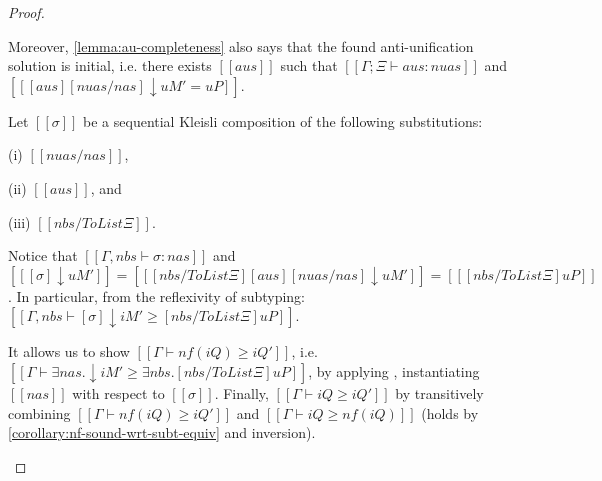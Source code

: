 \begin{proof}
\begin{caseof}
      Moreover, \cref{lemma:au-completeness} also says that the found anti-unification 
      solution is initial, i.e. there exists $[[aus]]$ such that
      $[[Γ;Ξ ⊢ aus :{nuas}]]$ and $[[ [aus][nuas/nas]↓uM' = uP ]]$.

      Let $[[σ]]$ be a sequential Kleisli composition of the following
      substitutions:
      \begin{enumerate*}
      \item[(i)] $[[nuas/nas]]$,
      \item[(ii)] $[[aus]]$, and
      \item[(iii)] $[[nbs / ToList Ξ]]$.
      \end{enumerate*}
      Notice that $[[Γ, nbs ⊢ σ :{nas}]]$
      and $[[ [σ]↓uM' ]] = [[ [nbs / ToList Ξ][aus][nuas/nas]↓uM' ]] = [[ [nbs /
      ToList Ξ]uP ]]$. In particular, from the reflexivity of subtyping:
      $[[Γ, nbs ⊢ [σ]↓iM' ≥ [nbs / ToList Ξ]uP]]$.

      It allows us to show $[[Γ ⊢ nf(iQ) ≥ iQ']]$, i.e. $[[Γ ⊢ ∃nas.↓iM' ≥
      ∃nbs.[nbs / ToList Ξ]uP]]$, by applying ,
      instantiating $[[nas]]$ with respect to $[[σ]]$. Finally, $[[Γ ⊢ iQ ≥ iQ']]$
      by transitively combining $[[Γ ⊢ nf(iQ) ≥ iQ']]$ and $[[Γ ⊢ iQ ≥ nf(iQ)]]$ 
      (holds by \cref{corollary:nf-sound-wrt-subt-equiv} and inversion).
  \end{caseof}
\end{proof}